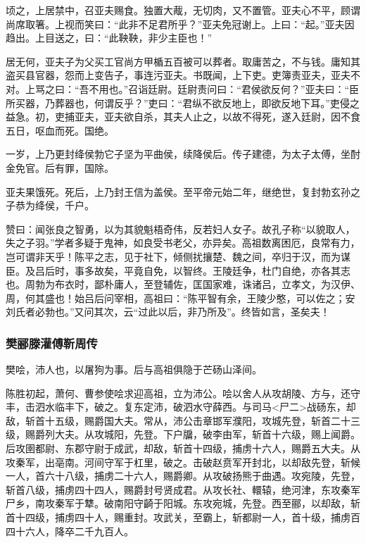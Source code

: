 \documentclass[]{article}
\begin{document}
顷之，上居禁中，召亚夫赐食。独置大胾，无切肉，又不置管。亚夫心不平，顾谓尚席取箸。上视而笑曰：``此非不足君所乎？''亚夫免冠谢上。上曰：``起。''亚夫因趋出。上目送之，曰：``此鞅鞅，非少主臣也！''

居无何，亚夫子为父买工官尚方甲楯五百被可以葬者。取庸苦之，不与钱。庸知其盗买县官器，怨而上变告子，事连污亚夫。书既闻，上下吏。吏簿责亚夫，亚夫不对。上骂之曰：``吾不用也。''召诣廷尉。廷尉责问曰：``君侯欲反何？''亚夫曰：``臣所买器，乃葬器也，何谓反乎？''吏曰：``君纵不欲反地上，即欲反地下耳。''吏侵之益急。初，吏捕亚夫，亚夫欲自杀，其夫人止之，以故不得死，遂入廷尉，因不食五日，呕血而死。国绝。

一岁，上乃更封绛侯勃它子坚为平曲侯，续降侯后。传子建德，为太子太傅，坐酎金免官。后有罪，国除。

亚夫果饿死。死后，上乃封王信为盖侯。至平帝元始二年，继绝世，复封勃玄孙之子恭为绛侯，千户。

赞曰：闻张良之智勇，以为其貌魁梧奇伟，反若妇人女子。故孔子称``以貌取人，失之子羽。''学者多疑于鬼神，如良受书老父，亦异矣。高祖数离困厄，良常有力，岂可谓非天乎！陈平之志，见于社下，倾侧扰攘楚、魏之间，卒归于汉，而为谋臣。及吕后时，事多故矣，平竟自免，以智终。王陵廷争，杜门自绝，亦各其志也。周勃为布衣时，鄙朴庸人，至登辅佐，匡国家难，诛诸吕，立孝文，为汉伊、周，何其盛也！始吕后问宰相，高祖曰：``陈平智有余，王陵少憨，可以佐之；安刘氏者必勃也。''又问其次，云``过此以后，非乃所及''。终皆如言，圣矣夫！

\hypertarget{header-n3845}{%
\subsubsection{樊郦滕灌傅靳周传}\label{header-n3845}}

樊哙，沛人也，以屠狗为事。后与高祖俱隐于芒砀山泽间。

陈胜初起，萧何、曹参使哙求迎高祖，立为沛公。哙以舍人从攻胡陵、方与，还守丰，击泗水临丰下，破之。复东定沛，破泗水守薛西。与司马\textless{}尸二\textgreater{}战砀东，却敌，斩首十五级，赐爵国大夫。常从，沛公击章邯军濮阳，攻城先登，斩首二十三级，赐爵列大夫。从攻城阳，先登。下户牖，破李由军，斩首十六级，赐上闻爵。后攻圉都尉、东郡守尉于成武，却敌，斩首十四级，捕虏十六人，赐爵五大夫。从攻秦军，出亳南。河间守军于杠里，破之。击破赵贲军开封北，以却敌先登，斩候一人，首六十八级，捕虏二十六人，赐爵卿。从攻破扬熊于曲遇。攻宛陵，先登，斩首八级，捕虏四十四人，赐爵封号贤成君。从攻长社、轘辕，绝河津，东攻秦军尸乡，南攻秦军于犨。破南阳守齮于阳城。东攻宛城，先登。西至郦，以却敌，斩首十四级，捕虏四十人，赐重封。攻武关，至霸上，斩都尉一人，首十级，捕虏百四十六人，降卒二千九百人。
\end{document}
